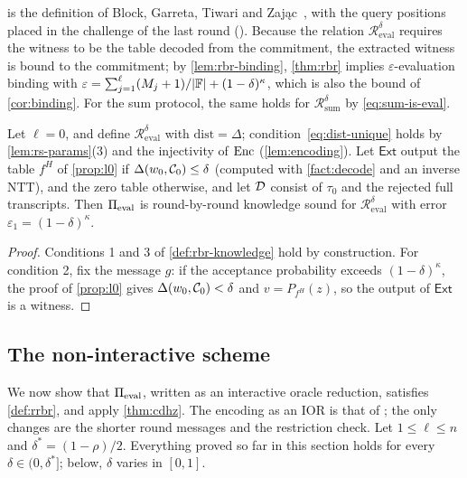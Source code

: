 \begin{remark}\label{rem:bgtz}
 is the definition of Block, Garreta, Tiwari and Zaj\k{a}c~\cite{BGTZ24}, with the query positions placed in the challenge of the last round ().
Because the relation $\mathcal{R}^{\delta}_{\mathrm{eval}}$ requires the witness to be the table decoded from the commitment, the extracted witness is bound to the commitment; by \cref{lem:rbr-binding}, \cref{thm:rbr} implies $\varepsilon$-evaluation binding with $\varepsilon = \sum_{j=1}^{\ell}(M_j+1)/|\mathbb{F}| + (1-\delta)^\kappa$, which is also the bound of \cref{cor:binding}.
For the sum protocol, the same holds for $\mathcal{R}^{\delta}_{\mathrm{sum}}$ by \eqref{eq:sum-is-eval}.
\end{remark}

\begin{proposition}[Round-by-round knowledge soundness for $\ell = 0$]\label{prop:rbr-l0}
Let $\ell = 0$, and define $\mathcal{R}^{\delta}_{\mathrm{eval}}$ with $\mathrm{dist} = \Delta$; condition~\eqref{eq:dist-unique} holds by \cref{lem:rs-params}(3) and the injectivity of $\mathrm{Enc}$ (\cref{lem:encoding}).
Let $\mathsf{Ext}$ output the table $f^H$ of \cref{prop:l0} if $\Delta(w_0, \mathcal{C}_0) \le \delta$ (computed with \cref{fact:decode} and an inverse NTT), and the zero table otherwise, and let $\mathcal{D}$ consist of $\tau_0$ and the rejected full transcripts.
Then $\Pi_{\mathrm{eval}}$ is round-by-round knowledge sound for $\mathcal{R}^{\delta}_{\mathrm{eval}}$ with error $\varepsilon_1 = (1-\delta)^\kappa$.
\end{proposition}

\begin{proof}
Conditions 1 and 3 of \cref{def:rbr-knowledge} hold by construction. For condition 2, fix the message $g$: if the acceptance probability exceeds $(1-\delta)^\kappa$, the proof of \cref{prop:l0} gives $\Delta(w_0, \mathcal{C}_0) < \delta$ and $v = P_{f^H}(z)$, so the output of $\mathsf{Ext}$ is a witness.
\end{proof}

\subsection{The non-interactive scheme}\label{sec:sound:pq}

We now show that $\Pi_{\mathrm{eval}}$, written as an interactive oracle reduction, satisfies \cref{def:rrbr}, and apply \cref{thm:cdhz}.
The encoding as an IOR is that of ; the only changes are the shorter round messages and the restriction check.
Let $1 \le \ell \le n$ and $\delta^* = (1-\rho)/2$.
Everything proved so far in this section holds for every $\delta \in (0, \delta^*]$; below, $\delta$ varies in $[0,1]$.

